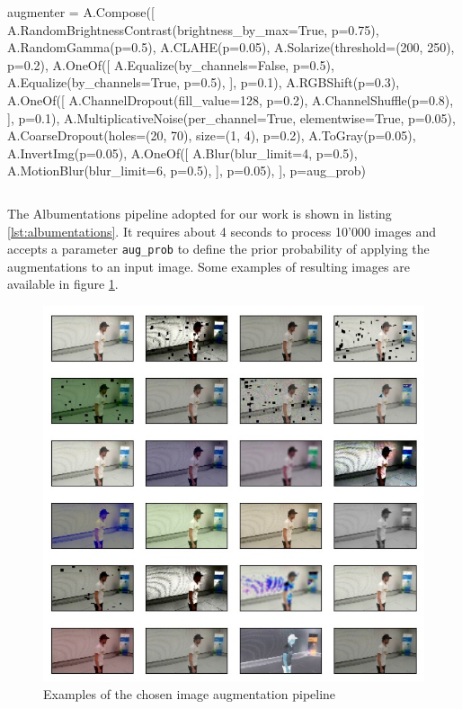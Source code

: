 \medskip

\begin{python}
augmenter = A.Compose([
	A.RandomBrightnessContrast(brightness_by_max=True, p=0.75),
	A.RandomGamma(p=0.5),
	A.CLAHE(p=0.05),
	A.Solarize(threshold=(200, 250), p=0.2),
	A.OneOf([
		A.Equalize(by_channels=False, p=0.5),
		A.Equalize(by_channels=True, p=0.5),
	], p=0.1),
	A.RGBShift(p=0.3),
	A.OneOf([
		A.ChannelDropout(fill_value=128, p=0.2),
		A.ChannelShuffle(p=0.8),
	], p=0.1),
	A.MultiplicativeNoise(per_channel=True, elementwise=True, p=0.05),
	A.CoarseDropout(holes=(20, 70), size=(1, 4), p=0.2),
	A.ToGray(p=0.05),
	A.InvertImg(p=0.05),
	A.OneOf([
		A.Blur(blur_limit=4, p=0.5),
		A.MotionBlur(blur_limit=6, p=0.5),
	], p=0.05),
], p=aug_prob)
\end{python}
\vspace{-0.5cm}
\begin{lstlisting}[frame=none,caption={Chosen Albumentations pipeline}, 
label=lst:albumentations]
\end{lstlisting}

The Albumentations pipeline adopted for our work is shown in listing \ref{lst:albumentations}. It requires about 4 seconds to process 10'000 images and accepts a parameter \texttt{aug\_prob} to define the prior probability of applying the augmentations to an input image. Some examples of resulting images are available in figure \ref{fig:albumentation-chosen}.

\begin{figure}[!h]
	\centering
	\includegraphics[width=1 \textwidth]{"contents/images/05-imgaug-chosen"}
	\caption[Examples of the chosen image augmentation pipeline]{Examples of the chosen image augmentation pipeline}
	\label{fig:albumentation-chosen}
\end{figure}


